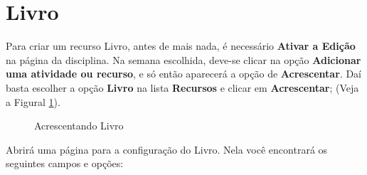 \section{Livro}
Para criar um recurso Livro, antes de mais nada, é necessário \textbf{Ativar a Edição} na página da disciplina.
Na semana escolhida, deve-se clicar na opção \textbf{Adicionar uma atividade ou recurso}, e só então aparecerá a opção de \textbf{Acrescentar}. Daí basta escolher a opção \textbf{Livro} na lista \textbf{Recursos} e clicar em \textbf{Acrescentar}; (Veja a Figural \ref{fig:cap4_32}).
\begin{figure}[htbp]
         \begin{center}
          \caption{Acrescentando Livro}
          \label{fig:cap4_32}
         \end{center}
\end{figure}

Abrirá uma página para a configuração do Livro. Nela você encontrará os seguintes campos e opções:

